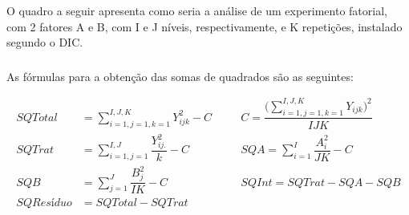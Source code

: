 \documentclass[14pt,aspectratio=1610]{beamer}
\begin{document}
\begin{frame}{}
\frametitle{}
\begin{block}{}
\justifying
O quadro a seguir apresenta como seria a análise de um experimento
fatorial, com 2 fatores A e B, com I e J níveis, respectivamente, e K repetições,
instalado segundo o DIC.
\end{block}
\pause
\begin{block}{}
\begin{table}[!h]
\end{table}
\end{block}
\end{frame}

\begin{frame}{}
\frametitle{}
\begin{block}{}
\justifying
As fórmulas para a obtenção das somas de quadrados são as seguintes:

\begin{align*}
SQTotal&={\displaystyle \sum_{i=1,j=1,k=1}^{I,J,K}Y_{ijk}^{2}-C} &\quad& 
C=\dfrac{\Biggl({\displaystyle \sum_{i=1,j=1,k=1}^{I,J,K}Y_{ijk}\Biggl)^{2}}}{IJK}\\
SQTrat&={\displaystyle \sum_{i=1,j=1}^{I,J}\dfrac{Y_{ij.}^{2}}{k}-C} &\quad& 
SQA={\displaystyle \sum_{i=1}^{I}\dfrac{A_{i}^{2}}{JK}-C}\\
SQB&={\displaystyle \sum_{j=1}^{J}\dfrac{B_{j}^{2}}{IK}-C} &\quad& 
SQInt=SQTrat-SQA-SQB\\
SQResíduo&=SQTotal-SQTrat &\quad& 
 \\
\end{align*}

\end{block}
\end{frame}
\end{document}
